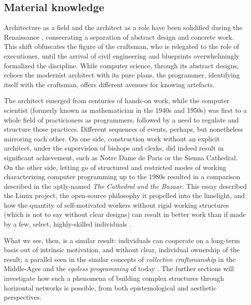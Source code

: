 \subsection{Material knowledge}
\label{subsec:material-knoweldge}

Architecture as a field and the architect as a role have been solidified during the Renaissance \citep{pevsner_term_1942}, consecrating a separation of abstract design and concrete work. This shift obfuscates the figure of the craftsman, who is relegated to the role of executioner, until the arrival of civil engineering and blueprints overwhelmingly formalized the discipline. While computer science, through its abstract designs, echoes the modernist architect with its pure plans, the programmer, identifying itself with the craftsman, offers different avenues for knowing artefacts.

The architect emerged from centuries of hands-on work, while the computer scientist (formerly known as mathematician in the 1940s and 1950s) was first to a whole field of practicioners as programmers, followed by a need to regulate and structure those practices. Different sequences of events, perhaps, but nonetheless mirroring each other. On one side, construction work without an explicit architect, under the supervision of bishops and clerks, did indeed result in significant achievement, such as Notre Dame de Paris or the Sienna Cathedral. On the other side, letting go of structured and restricted modes of working characterizing computer programming up to the 1980s resulted in a comparison described in the aptly-named \emph{The Cathedral and the Bazaar}. This essay described the Linux project, the open-source philosophy it propelled into the limelight, and how the quantity of self-motivated workers without rigid working structures (which is not to say without clear designs) can result in better work than if made by a few, select, highly-skilled individuals \citep{raymond_cathedral_2001,henningsen_joys_2020}.

What we see, then, is a similar result: individuals can cooperate on a long-term basis out of intrinsic motivation, and without clear, individual ownership of the result; a parallel seen in the similar concepts of \emph{collective craftsmanship} in the Middle-Ages and the \emph{egoless programming} of today \citep{brooks_mythical_1975}. The further sections will investigate how such a phenomena of building complex structures through horizontal networks is possible, from both epistemological and aesthetic perspectives.

